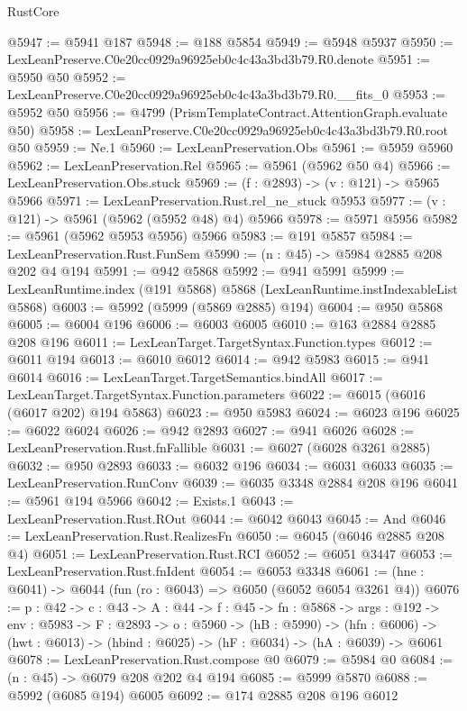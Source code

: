 \begin{lexlean}{RustCore}
\begin{coremodule}
@5947 := @5941 @187
@5948 := @188 @5854
@5949 := @5948 @5937
@5950 := LexLeanPreserve.C0e20cc0929a96925eb0c4c43a3bd3b79.R0.denote
@5951 := @5950 @50
@5952 := LexLeanPreserve.C0e20cc0929a96925eb0c4c43a3bd3b79.R0.__fits_0
@5953 := @5952 @50
@5956 := @4799 (PrismTemplateContract.AttentionGraph.evaluate @50)
@5958 := LexLeanPreserve.C0e20cc0929a96925eb0c4c43a3bd3b79.R0.root @50
@5959 := Ne.{1}
@5960 := LexLeanPreservation.Obs
@5961 := @5959 @5960
@5962 := LexLeanPreservation.Rel
@5965 := @5961 (@5962 @50 @4)
@5966 := LexLeanPreservation.Obs.stuck
@5969 := (f : @2893) -> (v : @121) -> @5965 @5966
@5971 := LexLeanPreservation.Rust.rel_ne_stuck @5953
@5977 := (v : @121) -> @5961 (@5962 (@5952 @48) @4) @5966
@5978 := @5971 @5956
@5982 := @5961 (@5962 @5953 @5956) @5966
@5983 := @191 @5857
@5984 := LexLeanPreservation.Rust.FunSem
@5990 := (n : @45) -> @5984 @2885 @208 @202 @4 @194
@5991 := @942 @5868
@5992 := @941 @5991
@5999 := LexLeanRuntime.index (@191 @5868) @5868 (LexLeanRuntime.instIndexableList @5868)
@6003 := @5992 (@5999 (@5869 @2885) @194)
@6004 := @950 @5868
@6005 := @6004 @196
@6006 := @6003 @6005
@6010 := @163 @2884 @2885 @208 @196
@6011 := LexLeanTarget.TargetSyntax.Function.types
@6012 := @6011 @194
@6013 := @6010 @6012
@6014 := @942 @5983
@6015 := @941 @6014
@6016 := LexLeanTarget.TargetSemantics.bindAll
@6017 := LexLeanTarget.TargetSyntax.Function.parameters
@6022 := @6015 (@6016 (@6017 @202) @194 @5863)
@6023 := @950 @5983
@6024 := @6023 @196
@6025 := @6022 @6024
@6026 := @942 @2893
@6027 := @941 @6026
@6028 := LexLeanPreservation.Rust.fnFallible
@6031 := @6027 (@6028 @3261 @2885)
@6032 := @950 @2893
@6033 := @6032 @196
@6034 := @6031 @6033
@6035 := LexLeanPreservation.RunConv
@6039 := @6035 @3348 @2884 @208 @196
@6041 := @5961 @194 @5966
@6042 := Exists.{1}
@6043 := LexLeanPreservation.Rust.ROut
@6044 := @6042 @6043
@6045 := And
@6046 := LexLeanPreservation.Rust.RealizesFn
@6050 := @6045 (@6046 @2885 @208 @4)
@6051 := LexLeanPreservation.Rust.RCI
@6052 := @6051 @3447
@6053 := LexLeanPreservation.Rust.fnIdent
@6054 := @6053 @3348
@6061 := (hne : @6041) -> @6044 (fun (ro : @6043) => @6050 (@6052 @6054 @3261 @4))
@6076 := {p : @42} ->
  {c : @43} ->
  {A : @44} ->
  {f : @45} ->
  {fn : @5868} ->
  {args : @192} ->
  {env : @5983} ->
  {F : @2893} ->
  {o : @5960} ->
  (hB : @5990) ->
  (hfn : @6006) -> (hwt : @6013) -> (hbind : @6025) -> (hF : @6034) -> (hA : @6039) -> @6061
@6078 := LexLeanPreservation.Rust.compose @0
@6079 := @5984 @0
@6084 := (n : @45) -> @6079 @208 @202 @4 @194
@6085 := @5999 @5870
@6088 := @5992 (@6085 @194) @6005
@6092 := @174 @2885 @208 @196 @6012

\end{coremodule}
\end{lexlean}
